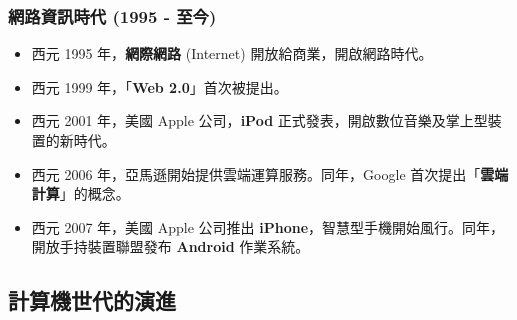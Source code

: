 \documentclass[12pt,a4paper,oneside]{report}
\begin{document}
\begin{CJK}{UTF8}{bkai}
\subsubsection{網路資訊時代 (1995 - 至今)}
\begin{itemize}
\item 西元 1995 年，\textbf{網際網路} (Internet) 開放給商業，開啟網路時代。
\item 西元 1999 年，「\textbf{Web 2.0}」首次被提出。
\item 西元 2001 年，美國 Apple 公司，\textbf{iPod} 正式發表，開啟數位音樂及掌上型裝置的新時代。
\item 西元 2006 年，亞馬遜開始提供雲端運算服務。同年，Google 首次提出「\textbf{雲端計算}」的概念。
\item 西元 2007 年，美國 Apple 公司推出 \textbf{iPhone}，智慧型手機開始風行。同年，開放手持裝置聯盟發布 \textbf{Android} 作業系統。
\end{itemize}

\subsection{計算機世代的演進}


\end{CJK}
\end{document}
